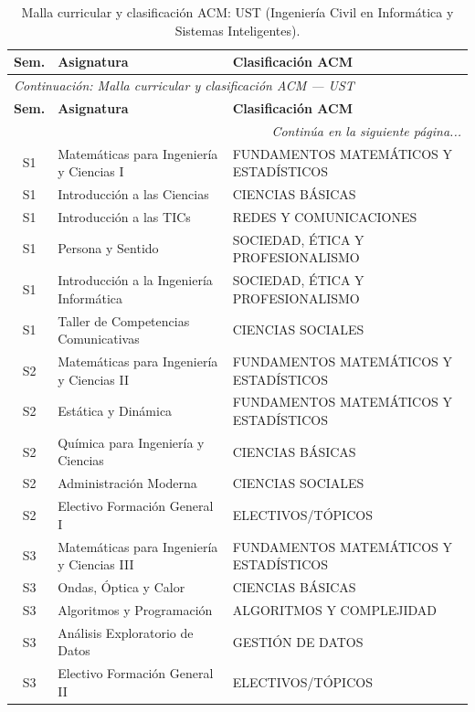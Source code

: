 \documentclass[11pt,a4paper]{article}
\begin{document}
\begin{small}
\begin{longtable}{c >{\raggedright\arraybackslash}p{8.5cm} >{\raggedright\arraybackslash}p{5.5cm}}
\caption{Malla curricular y clasificación ACM: UST (Ingeniería Civil en Informática y Sistemas Inteligentes).} \label{tab:UST12} \\
\toprule
\textbf{Sem.} & \textbf{Asignatura} & \textbf{Clasificación ACM} \\
\midrule
\endfirsthead
\multicolumn{3}{l}{\small\textit{Continuación: Malla curricular y clasificación ACM --- UST}} \\[3pt]
\toprule
\textbf{Sem.} & \textbf{Asignatura} & \textbf{Clasificación ACM} \\
\midrule
\endhead
\midrule
\multicolumn{3}{r}{\small\textit{Continúa en la siguiente página...}} \\
\endfoot
\bottomrule
\endlastfoot
S1 & Matemáticas para Ingeniería y Ciencias I & FUNDAMENTOS MATEMÁTICOS Y ESTADÍSTICOS \\
S1 & Introducción a las Ciencias & CIENCIAS BÁSICAS \\
S1 & Introducción a las TICs & REDES Y COMUNICACIONES \\
S1 & Persona y Sentido & SOCIEDAD, ÉTICA Y PROFESIONALISMO \\
S1 & Introducción a la Ingeniería Informática & SOCIEDAD, ÉTICA Y PROFESIONALISMO \\
S1 & Taller de Competencias Comunicativas & CIENCIAS SOCIALES \\
S2 & Matemáticas para Ingeniería y Ciencias II & FUNDAMENTOS MATEMÁTICOS Y ESTADÍSTICOS \\
S2 & Estática y Dinámica & FUNDAMENTOS MATEMÁTICOS Y ESTADÍSTICOS \\
S2 & Química para Ingeniería y Ciencias & CIENCIAS BÁSICAS \\
S2 & Administración Moderna & CIENCIAS SOCIALES \\
S2 & Electivo Formación General I & ELECTIVOS/TÓPICOS \\
S3 & Matemáticas para Ingeniería y Ciencias III & FUNDAMENTOS MATEMÁTICOS Y ESTADÍSTICOS \\
S3 & Ondas, Óptica y Calor & CIENCIAS BÁSICAS \\
S3 & Algoritmos y Programación & ALGORITMOS Y COMPLEJIDAD \\
S3 & Análisis Exploratorio de Datos & GESTIÓN DE DATOS \\
S3 & Electivo Formación General II & ELECTIVOS/TÓPICOS \\

\end{longtable}
\end{small}
\end{document}
